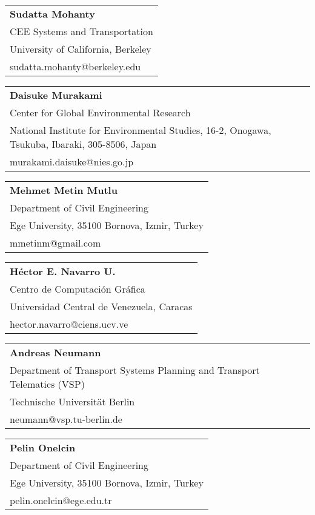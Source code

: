 \begin{tabular}[width=0.48\textwidth]{@{}l}
\textbf{Sudatta Mohanty} \\
CEE Systems and Transportation \\
University of California, Berkeley \\
sudatta.mohanty@berkeley.edu \\
\end{tabular}

\begin{tabular}[width=0.48\textwidth]{@{}l}
\textbf{Daisuke Murakami} \\
Center for Global Environmental Research \\
National Institute for Environmental Studies, 16-2, Onogawa, Tsukuba, Ibaraki, 305-8506, Japan \\
murakami.daisuke@nies.go.jp  \\
\end{tabular}

\begin{tabular}[width=0.48\textwidth]{@{}l}
\textbf{Mehmet Metin Mutlu} \\
Department of Civil Engineering \\
Ege University, 35100 Bornova, Izmir, Turkey \\
mmetinm@gmail.com \\
\end{tabular}

\begin{tabular}[width=0.48\textwidth]{@{}l}
\textbf{Héctor E. Navarro U.} \\
Centro de Computación Gráfica \\
Universidad Central de Venezuela, Caracas \\
hector.navarro@ciens.ucv.ve \\
\end{tabular}

\begin{tabular}[width=0.48\textwidth]{@{}l}
\textbf{Andreas Neumann} \\
Department of Transport Systems Planning and Transport Telematics (VSP) \\
Technische Universität Berlin \\
neumann@vsp.tu-berlin.de \\
\end{tabular}

\begin{tabular}[width=0.48\textwidth]{@{}l}
\textbf{Pelin Onelcin} \\
Department of Civil Engineering \\
Ege University, 35100 Bornova, Izmir, Turkey \\
pelin.onelcin@ege.edu.tr \\
\end{tabular}

